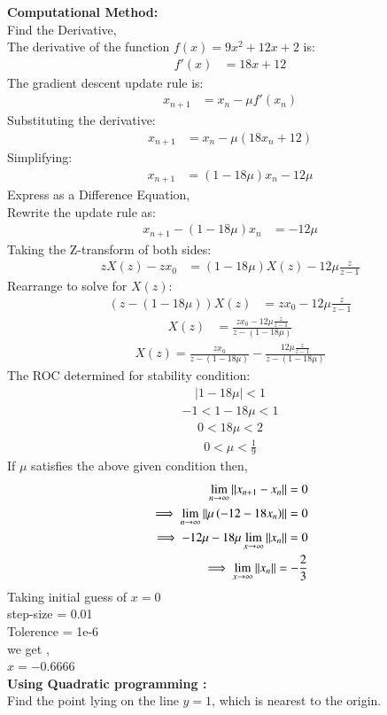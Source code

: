 \documentclass[article]{IEEEtran}
\numberwithin{figure}{enumi}
\begin{document}
\noindent\textbf{Computational Method:}\\
Find the Derivative,\\
The derivative of the function $f(x) = 9x^2 + 12x + 2$ is:
\begin{align}
f'(x) &= 18x + 12
\end{align}
The gradient descent update rule is:
\begin{align}
x_{n+1} &= x_n - \mu f'(x_n)
\end{align}
Substituting the derivative:
\begin{align}
x_{n+1} &= x_n - \mu (18x_n + 12)
\end{align}
Simplifying:
\begin{align}
x_{n+1} &= (1 - 18\mu)x_n - 12\mu
\end{align}
Express as a Difference Equation,\\
Rewrite the update rule as:
\begin{align}
x_{n+1} - (1 - 18\mu)x_n &= -12\mu
\end{align}
Taking the Z-transform of both sides:
\begin{align}
zX(z) - zx_0 &= (1 - 18\mu)X(z) - 12\mu \frac{z}{z-1}
\end{align}
Rearrange to solve for $X(z)$:
\begin{align}
(z - (1 - 18\mu))X(z) &= zx_0 - 12\mu \frac{z}{z-1}
\end{align}
\begin{align}
X(z) &= \frac{zx_0 - 12\mu \frac{z}{z-1}}{z - (1 - 18\mu)}
\end{align}
\begin{align}
X(z) = \frac{zx_0}{z - (1 - 18\mu)}-\frac{12\mu \frac{z}{z-1}}{z - (1 - 18\mu)}
\end{align}
The ROC determined for stability condition:
\begin{align}
    |1-18\mu|<1
\end{align}
\begin{align}
    -1<1-18\mu<1
\end{align}
\begin{align}
    0<18\mu<2 
\end{align}
\begin{align}
    0<\mu<\frac{1}{9}
\end{align}
If $\mu$ satisfies the above given condition then,
\begin{align}
    \lim_{n\rightarrow\infty}\left\lVert x_{n+1}-x_n\right\rVert=0\\
    \implies \lim_{n\rightarrow\infty}\left\lVert\mu\left(-12-18x_n\right)\right\rVert=0\\
    \implies -12\mu-18\mu\lim_{x\rightarrow\infty}\left\lVert x_n\right\rVert=0\\
    \implies \lim_{x\rightarrow\infty}\left\lVert x_n\right\rVert=-\frac{2}{3}
\end{align}
Taking initial guess of $x=0$\\
step-size = 0.01\\
Tolerence = 1e-6\\
we get ,\\
$x=-0.6666$\\
\textbf{Using Quadratic programming :}\\
Find the point lying on the line $y = 1$, which is nearest to the origin.
\end{document}
